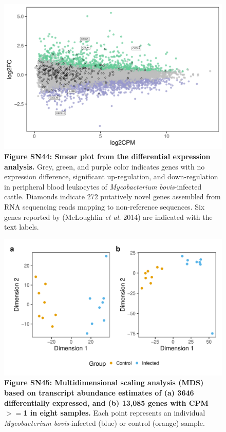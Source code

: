 \documentclass[../main.tex]{subfiles}
\begin{document}
\begin{flushleft}
\bigskip
\begin{figure}[!htb]
    \centering
    \includegraphics[width=\textwidth]{paper3/supplement/sp418.pdf}
    \caption*{\textbf{\hypertarget{Figure SN44}{Figure SN44}: Smear plot from the differential expression analysis.} Grey, green, and purple color indicates genes with no expression difference, significant up-regulation, and down-regulation in peripheral blood leukocytes of \emph{ Mycobacterium bovis}-infected cattle. Diamonds indicate 272 putatively novel genes assembled from RNA sequencing reads mapping to non-reference sequences. Six genes reported by (McLoughlin \emph{ et al.} 2014) are indicated with the text labels.}
\end{figure}

\bigskip
\begin{figure}[!htb]
    \centering
    \includegraphics[width=\textwidth]{paper3/supplement/sp419.pdf}
    \caption*{\textbf{\hypertarget{Figure SN45}{Figure SN45}: Multidimensional scaling analysis (MDS) based on transcript abundance estimates of (a) 3646 differentially expressed, and (b) 13,085 genes with CPM$>=$1 in eight samples.} Each point represents an individual \emph{Mycobacterium bovis}-infected (blue) or control (orange) sample.}
\end{figure}


\end{flushleft}
\end{document}
